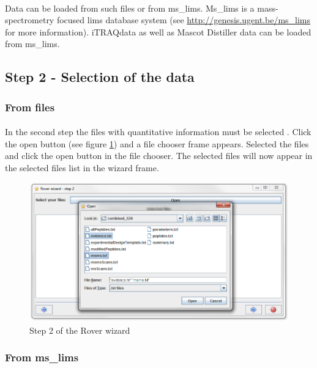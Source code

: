 \documentclass[11pt,a4paper,oneside,notitlepage]{book}
\begin{document}
\paragraph{}Data can be loaded from such files or from ms\_lims. Ms\_lims is a mass-spectrometry focused lims database system (see \url{http://genesis.ugent.be/ms_lims} for more information).  iTRAQ\texttrademark data as well as Mascot Distiller data can be loaded from ms\_lims.

\subsection{Step 2 - Selection of the data}
\subsubsection{From files}
\paragraph{}In the second step the files with quantitative information must be selected . Click the open button (see figure \ref{step2A}) and a file chooser frame appears. Selected the files and click the open button in the file chooser. The selected files will now appear in the selected files list in the wizard frame.

\begin{figure}[H]
\begin{center}
\includegraphics[scale=0.4]{Rover_wizard_-_step_2_S.png}
\caption{Step 2 of the Rover wizard}
\label{step2A}
\end{center}
\end{figure}

\subsubsection{From ms\_lims}
\end{document}
